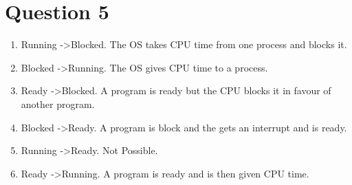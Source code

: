 \documentclass[12pt]{extarticle}
\begin{document}
	\section*{Question 5}
		\begin{enumerate}
			\item Running -\textgreater Blocked.  The OS takes CPU time from one process and blocks it.
			\item Blocked -\textgreater Running.  The OS gives CPU time to a process.
			\item Ready -\textgreater Blocked.  A program is ready but the CPU blocks it in favour of another program.
			\item Blocked -\textgreater Ready.  A program is block and the gets an interrupt and is ready.
			\item Running -\textgreater Ready.  Not Possible.
			\item Ready -\textgreater Running.  A program is ready and is then given CPU time.
		\end{enumerate}
	\clearpage
\end{document}
